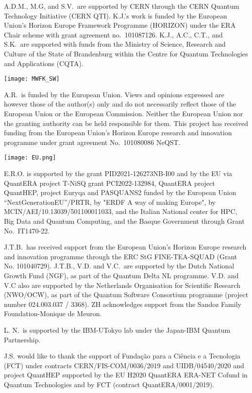 \begin{acknowledgments}

A.D.M., M.G, and S.V.\ are supported by CERN through the CERN Quantum Technology Initiative (CERN QTI).
K.J.'s work is funded by the European Union’s Horizon Europe Framework Programme (HORIZON) under the ERA Chair scheme with grant agreement no.\ 101087126.
K.J., A.C., C.T., and S.K.\ are supported with funds from the Ministry of Science, Research and Culture of the State of Brandenburg within the Centre for Quantum Technologies and Applications (CQTA). 
\begin{center}
    \texttt{[image: MWFK\_SW]}
\end{center}

A.R.\ is funded by the European Union. Views and opinions expressed are however those of the author(s) only and do not necessarily reflect those of the European Union or the European Commission. Neither the European Union nor the granting authority can be held responsible for them. This project has received funding from the European Union’s Horizon Europe research and innovation programme under grant agreement No.\ 101080086 NeQST.
\begin{center}
    \texttt{[image: EU.png]}
\end{center}

E.R.O. is supported by the grant PID2021-126273NB-I00 and by the EU via QuantERA project T-NiSQ grant PCI2022-132984, QuantERA project QuantHEP, project Euryqa and PASQUANS2 funded by the European Union ``NextGenerationEU''/PRTR, by "ERDF A way of making Europe", by MCIN/AEI/10.13039/501100011033, and the Italian National center for HPC, Big Data and Quantum Computing, and the Basque Government through Grant No.\ IT1470-22. 

J.T.B.\ has received support from the European Union’s Horizon Europe research and innovation programme through the ERC StG FINE-TEA-SQUAD (Grant No. 101040729).
J.T.B., V.D. and V.C.\ are supported by the Dutch National Growth Fund (NGF), as part of the Quantum Delta NL programme.
V.D. and V.C also are supported by the Netherlands Organisation for Scientific Research (NWO/OCW), as part of the Quantum Software Consortium programme (project number 024.003.037 / 3368). ZH acknowledges support from the Sandoz Family Foundation-Monique de Meuron.

L. N.\ is supported by the IBM-UTokyo lab under the Japan-IBM Quantum Partnership.

J.S. would like to thank the support of Funda\c{c}\~ao para a Ci\^encia e a Tecnologia (FCT) under contracts CERN/FIS-COM/0036/2019 and UIDB/04540/2020 and project QuantHEP supported by the EU H2020 QuantERA ERA-NET Cofund in Quantum Technologies and by FCT (contract QuantERA/0001/2019).


\end{acknowledgments}
